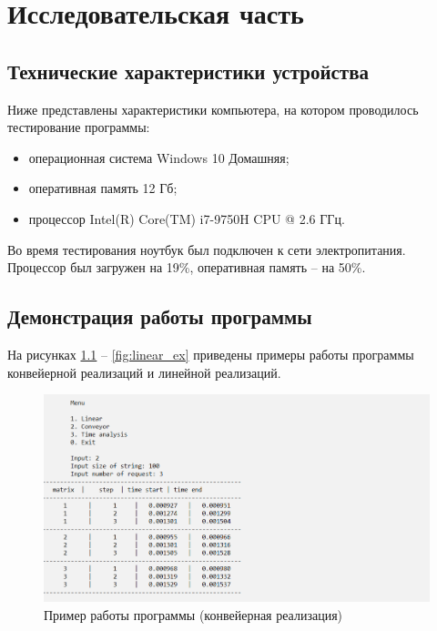 \chapter{Исследовательская часть}

\section{Технические характеристики устройства}

Ниже представлены характеристики компьютера, на котором проводилось тестирование программы:
\begin{itemize}[label=---]
    \item операционная система Windows 10 Домашняя;
    \item оперативная память 12 Гб;
    \item процессор Intel(R) Core(TM) i7-9750H CPU @ 2.6 ГГц.
\end{itemize}

Во время тестирования ноутбук был подключен к сети электропитания. 
Процессор был загружен на 19\%, оперативная память -- на 50\%.


\section{Демонстрация работы программы}
На рисунках \ref{fig:parallel_ex} -- \ref{fig:linear_ex} приведены примеры работы программы конвейерной реализаций и 
линейной реализаций.
\begin{figure}[h]
	\centering
	\includegraphics[scale=0.6]{img/example_para.png}
	\caption{Пример работы программы (конвейерная реализация)}
	\label{fig:parallel_ex}
\end{figure}

